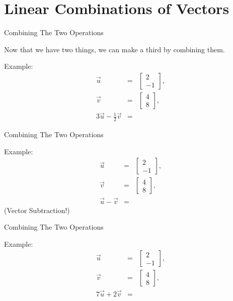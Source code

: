 \documentclass[svgnames,table,,aspectratio=169]{beamer}
\newcommand{\columnVector}[1]{%
  \left[
    \begin{array}{r}
    #1                           
    \end{array}
  \right]
}
\begin{document}
  \section{Linear Combinations of Vectors}

\begin{frame}{Combining The Two Operations}

  Now that we have two things, we can make a third by combining them.

  Example:
  \begin{eqnarray*}
    \vec{u} & = & \columnVector{2 \\ -1 }, \\
    \vec{v} & = & \columnVector{4 \\ 8}, \\
    3\vec{u} - \frac{1}{2} \vec{v} & = & 
  \end{eqnarray*}
    
\end{frame}

\begin{frame}{Combining The Two Operations}

  Example:
  \begin{eqnarray*}
    \vec{u} & = & \columnVector{2 \\ -1 }, \\
    \vec{v} & = & \columnVector{4 \\ 8}, \\
    \vec{u} -  \vec{v} & = & 
  \end{eqnarray*}
  (Vector Subtraction!)
    
\end{frame}

\begin{frame}{Combining The Two Operations}

  Example:
  \begin{eqnarray*}
    \vec{u} & = & \columnVector{2 \\ -1 }, \\
    \vec{v} & = & \columnVector{4 \\ 8}, \\
    7\vec{u} + 2\vec{v} & = & 
  \end{eqnarray*}
    
\end{frame}
\end{document}
